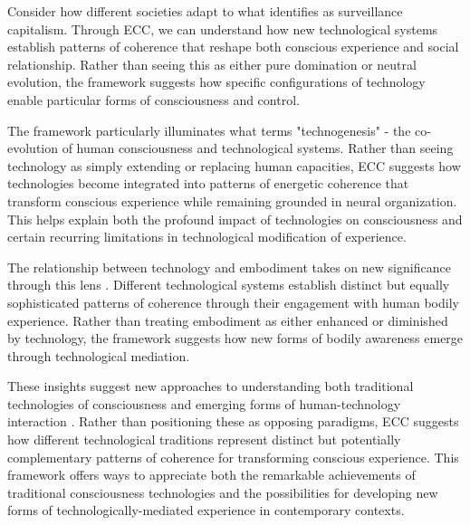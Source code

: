 Consider how different societies adapt to what \cite{zuboff2019age} identifies as surveillance capitalism. Through ECC, we can understand how new technological systems establish patterns of coherence that reshape both conscious experience and social relationship. Rather than seeing this as either pure domination or neutral evolution, the framework suggests how specific configurations of technology enable particular forms of consciousness and control.

The framework particularly illuminates what \cite{hayles2012how} terms "technogenesis" - the co-evolution of human consciousness and technological systems. Rather than seeing technology as simply extending or replacing human capacities, ECC suggests how technologies become integrated into patterns of energetic coherence that transform conscious experience while remaining grounded in neural organization. This helps explain both the profound impact of technologies on consciousness and certain recurring limitations in technological modification of experience.

The relationship between technology and embodiment takes on new significance through this lens \cite{ihde2009postphenomenology}. Different technological systems establish distinct but equally sophisticated patterns of coherence through their engagement with human bodily experience. Rather than treating embodiment as either enhanced or diminished by technology, the framework suggests how new forms of bodily awareness emerge through technological mediation.

These insights suggest new approaches to understanding both traditional technologies of consciousness and emerging forms of human-technology interaction \cite{verbeek2005what}. Rather than positioning these as opposing paradigms, ECC suggests how different technological traditions represent distinct but potentially complementary patterns of coherence for transforming conscious experience. This framework offers ways to appreciate both the remarkable achievements of traditional consciousness technologies and the possibilities for developing new forms of technologically-mediated experience in contemporary contexts.
